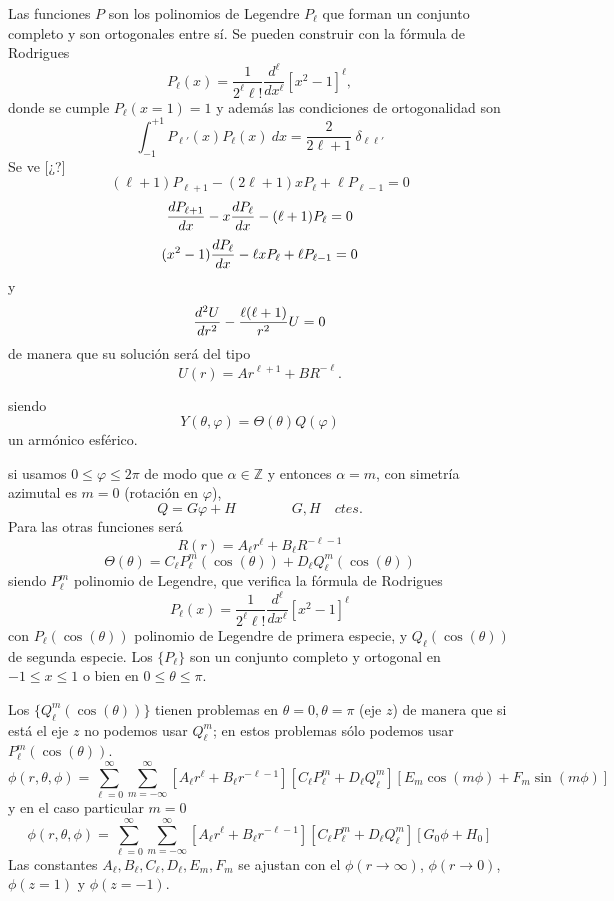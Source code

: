 \documentclass[10pt,oneside]{CBFT_book}
\begin{document}
Las funciones $P$ son los polinomios de Legendre $P_\ell$ que forman un conjunto completo y son ortogonales
entre sí. Se pueden construir con la fórmula de Rodrigues
\[
	P_\ell (x) = \frac{1}{2^\ell \ell!} \frac{d^\ell}{d x^\ell} [x^2 - 1]^\ell, 
\]
donde se cumple $P_\ell(x=1) = 1$ y además las condiciones de ortogonalidad son
\[
	\int_{-1}^{+1} P_{\ell'}(x) P_\ell (x) \: dx= \frac{2}{2\ell + 1} \: \delta_{\ell\ell'}
\]
Se ve [¿?]
\[
	(\ell+1) P_{\ell+1} - (2\ell+1) x P_{\ell} + \ell P_{\ell-1} = 0
\]
\[
	\dtot{P_{\ell+1}}{x} - x \dtot{P_{\ell}}{x} - (\ell+1) P_{\ell} = 0
\]
\[
	(x^2-1) \dtot{P_{\ell}}{x} - \ell x P_{\ell} + \ell P_{\ell-1} = 0
\]
y
\[
	\dtot[2]{U}{r} - \frac{\ell(\ell+1)}{r^2} U = 0
\]
de manera que su solución será del tipo
\[
	U(r) = A r^{\ell+1} + B R^{-\ell}.
\]

siendo
\[
	Y(\theta,\varphi) = \Theta(\theta) Q(\varphi)
\]
un armónico esférico.


si usamos $0\leq \varphi \leq 2\pi$ de modo que $\alpha\in\mathbb{Z}$ y entonces $\alpha=m$, con simetría
azimutal es $m=0$ (rotación en $\varphi$), 
\[
	Q = G\varphi + H \qquad\qquad  G,H \quad ctes.
\]
Para las otras funciones será
\[
	R(r) = A_\ell r^\ell + B_\ell R^{-\ell-1}
\]
\[
	\Theta(\theta) = C_\ell P_\ell^m (\cos(\theta)) + D_\ell Q_\ell^m (\cos(\theta))
\]
siendo $P_\ell^m$ polinomio de Legendre, que verifica la fórmula de Rodrigues
\[
	P_\ell (x) = \frac{1}{2^\ell \ell!} \frac{d^\ell}{d x^\ell} [x^2 - 1]^\ell
\]
con $P_\ell(\cos(\theta))$ polinomio de Legendre de primera especie, y $Q_\ell(\cos(\theta))$ de segunda
especie.
Los $\{ P_\ell\}$ son un conjunto completo y ortogonal en $-1 \leq x \leq 1$ o bien en $0\leq \theta\leq \pi$.

Los $\{ Q_\ell^m(\cos(\theta))\}$ tienen problemas en $\theta=0,\theta=\pi$ (eje $z$) de manera que si está el
eje $z$ no podemos usar $Q_\ell^m$; en estos problemas sólo podemos usar $P_\ell^m(\cos(\theta))$.
\[
	\phi(r,\theta,\phi) = \sum_{\ell=0}^{\infty}\sum_{m=-\infty}^{\infty} \left[ A_\ell r^\ell + 
	B_\ell r^{-\ell-1} \right] \left[ C_\ell P_\ell^m + D_\ell Q_\ell^m \right] \left[ E_m \cos(m\phi) + 
	F_m \sin(m\phi) \right]
\]
y en el caso particular $m=0$
\[
	\phi(r,\theta,\phi) = \sum_{\ell=0}^{\infty}\sum_{m=-\infty}^{\infty} \left[ A_\ell r^\ell + 
	B_\ell r^{-\ell-1} \right] \left[ C_\ell P_\ell^m + D_\ell Q_\ell^m \right] \left[ G_0 \phi + 
	H_0 \right]	
\]
Las constantes $A_\ell, B_\ell, C_\ell, D_\ell, E_m, F_m$ se ajustan con el $\phi (r\to\infty)$, 
$\phi (r\to 0)$, $\phi (z = 1)$ y $\phi (z = -1)$.
\end{document}
